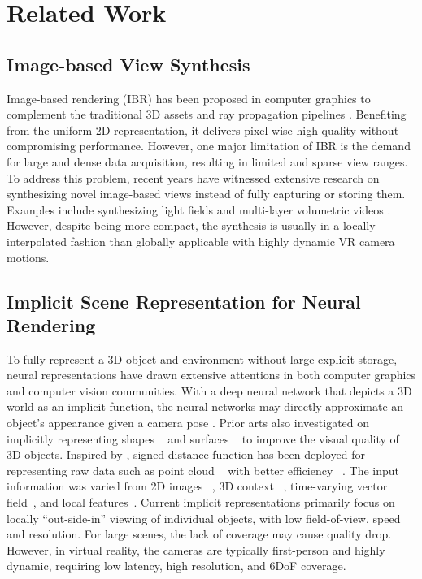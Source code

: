 \section{Related Work}
\label{sec:prior}

\subsection{Image-based View Synthesis}
Image-based rendering (IBR) has been proposed in computer graphics to complement the traditional 3D assets and ray propagation pipelines \cite{levoy1996light,gortler1996lumigraph,shum2000review}. Benefiting from the uniform 2D representation, it delivers pixel-wise high quality without compromising performance. However, one major limitation of IBR is the demand for large and dense data acquisition, resulting in limited and sparse view ranges. 
To address this problem, recent years have witnessed extensive research on synthesizing novel image-based views instead of fully capturing or storing them. Examples include synthesizing light fields \cite{LearningViewSynthesis,Li2020LF,mildenhall2019llff} and multi-layer volumetric videos \cite{Broxton:immersiveLF}. However, despite being more compact, the synthesis is usually in a locally interpolated fashion than globally applicable with highly dynamic VR camera motions.

\subsection{Implicit Scene Representation for Neural Rendering}
To fully represent a 3D object and environment without large explicit storage, neural representations have drawn extensive attentions in both computer graphics and computer vision communities. 
With a deep neural network that depicts a 3D world as an implicit function, the neural networks may directly approximate an object's appearance given a camera pose \cite{sitzmann2019deepvoxels,sitzmann2019srns,sitzmann2019siren,mildenhall2020nerf}. 
Prior arts also investigated on implicitly representing shapes ~\cite{park2019deepsdf} and surfaces ~\cite{mescheder2019occupancy} to improve the visual quality of 3D objects. Inspired by \cite{park2019deepsdf}, signed distance function has been deployed for representing raw data such as point cloud ~\cite{atzmon2020sal,gropp2020implicit} with better efficiency ~\cite{chabra2020deep}. 
The input information was varied from 2D images ~\cite{lin2020sdf, yariv2020multiview}, 3D context ~\cite{saito2019pifu, oechsle2019texture}, time-varying vector field~\cite{niemeyer2019occupancy}, and local features~\cite{tretschk2020patchnets, liu2020neural}.
Current implicit representations primarily focus on locally ``out-side-in'' viewing of individual objects, with low field-of-view, speed and resolution. For large scenes, the lack of coverage may cause quality drop.
However, in virtual reality, the cameras are typically first-person and highly dynamic, requiring low latency, high resolution, and 6DoF coverage. 

